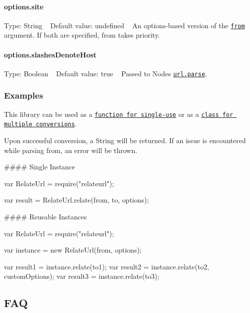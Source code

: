\paragraph*{options.\+site}

Type\+: {\ttfamily String} ~\newline
Default value\+: {\ttfamily undefined} ~\newline
 An options-\/based version of the \href{#examples}{\tt {\ttfamily from}} argument. If both are specified, {\ttfamily from} takes priority.

\paragraph*{options.\+slashes\+Denote\+Host}

Type\+: {\ttfamily Boolean} ~\newline
Default value\+: {\ttfamily true} ~\newline
 Passed to Node\textquotesingle{}s \href{http://nodejs.org/api/url.html#url_url_parse_urlstr_parsequerystring_slashesdenotehost}{\tt {\ttfamily url.\+parse}}.

\subsubsection*{Examples}

This library can be used as a \href{#single-instance}{\tt function for single-\/use} or as a \href{#reusable-instances}{\tt class for multiple conversions}.

Upon successful conversion, a {\ttfamily String} will be returned. If an issue is encountered while parsing {\ttfamily from}, an error will be thrown.

\#\#\#\# Single Instance 
\begin{DoxyCode}
var RelateUrl = require("relateurl");

var result = RelateUrl.relate(from, to, options);
\end{DoxyCode}


\#\#\#\# Reusable Instances 
\begin{DoxyCode}
var RelateUrl = require("relateurl");

var instance = new RelateUrl(from, options);

var result1 = instance.relate(to1);
var result2 = instance.relate(to2, customOptions);
var result3 = instance.relate(to3);
\end{DoxyCode}


\subsection*{F\+AQ}


